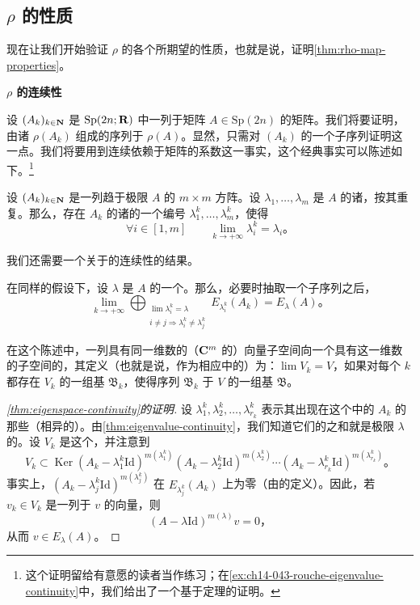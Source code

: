 \subsection{$\rho$ 的性质}
\label{subsec:rho-properties}

现在让我们开始验证 $\rho$ 的各个所期望的性质，也就是说，证明\cref{thm:rho-map-properties}。

\textbf{$\rho$ 的连续性}

设 $(A_k)_{k\in\mathbf{N}}$ 是 $\mathrm{Sp}(2n;\mathbf{R})$ 中一列\trConvergence{}于矩阵 $A\in\mathrm{Sp}(2n)$ 的矩阵。我们将要证明，由诸 $\rho(A_k)$ 组成的序列\trConvergence{}于 $\rho(A)$。显然，只需对 $(A_k)$ 的一个子序列证明这一点。我们将要用到\trEigenvalue{}连续依赖于矩阵的系数这一事实，这个经典事实可以陈述如下。\nolinebreak\footnote{这个证明留给有意愿的读者当作练习；在\cref{ex:ch14-043-rouche-eigenvalue-continuity}中，我们给出了一个基于\trRouche{}定理的证明。}

\begin{proposition}\label{thm:eigenvalue-continuity}
设 $(A_k)_{k\in\mathbf{N}}$ 是一列趋于极限 $A$ 的 $m\times m$ 方阵。设 $\lambda_1,\dotsc,\lambda_m$ 是 $A$ 的诸\trEigenvalue，按其\trMultiplicity{}重复。那么，存在 $A_k$ 的诸\trEigenvalue{}的一个编号 $\lambda^k_1,\dotsc,\lambda^k_m$，使得
\[
\forall i\in[1,m]\qquad\lim_{k\to+\infty}\lambda^k_i=\lambda_i\text{。}
\]
\end{proposition}

我们还需要一个关于\trGeneralizedEigenspace{}的连续性的结果。

\begin{proposition}\label{thm:eigenspace-continuity}
在同样的假设下，设 $\lambda$ 是 $A$ 的一个\trEigenvalue。那么，必要时抽取一个子序列之后，
\[
\lim_{k\to+\infty}\bigoplus_{\substack{\lim\lambda^k_i=\lambda\\ i\neq j\Rightarrow\lambda^k_i\neq\lambda^k_j}}E_{\lambda^k_i}(A_k)=E_\lambda(A)\text{。}
\]
\end{proposition}

在这个陈述中，一列具有同一维数的（$\mathbf{C}^m$ 的）向量子空间向一个具有这一维数的子空间的\trConvergence，其定义（也就是说，作为相应\trGrassmann\trManifold{}中的\trConvergence）为：$\lim V_k=V$，如果对每个 $k$ 都存在 $V_k$ 的一组\trUnitary{}基 $\mathfrak{B}_k$，使得序列 $\mathfrak{B}_k$ \trConvergence{}于 $V$ 的一组基 $\mathfrak{B}$。

\begin{proof}[\cref{thm:eigenspace-continuity}的证明]
设 $\lambda^k_1,\lambda^k_2,\dotsc,\lambda^k_{r_k}$ 表示其\trGeneralizedEigenspace{}出现在这个\trDirectSum{}中的 $A_k$ 的那些（相异的）\trEigenvalue。由\cref{thm:eigenvalue-continuity}，我们知道它们的\trMultiplicity{}之和就是极限 $\lambda$ 的\trMultiplicity。设 $V_k$ 是这个\trDirectSum，并注意到
\[
V_k\subset\operatorname{Ker}(A_k-\lambda^k_1\mathrm{Id})^{m(\lambda^k_1)}
(A_k-\lambda^k_2\mathrm{Id})^{m(\lambda^k_2)}\cdots
(A_k-\lambda^k_{r_k}\mathrm{Id})^{m(\lambda^k_{r_k})}\text{。}
\]
事实上，$(A_k-\lambda^k_j\mathrm{Id})^{m(\lambda^k_j)}$ 在\trGeneralizedEigenspace{} $E_{\lambda^k_j}(A_k)$ 上为零（由\trGeneralizedEigenspace{}的定义）。因此，若 $v_k\in V_k$ 是一列\trConvergence{}于 $v$ 的向量，则
\[
(A-\lambda\mathrm{Id})^{m(\lambda)}v=0\text{，}
\]
从而 $v\in E_\lambda(A)$。
\end{proof}

